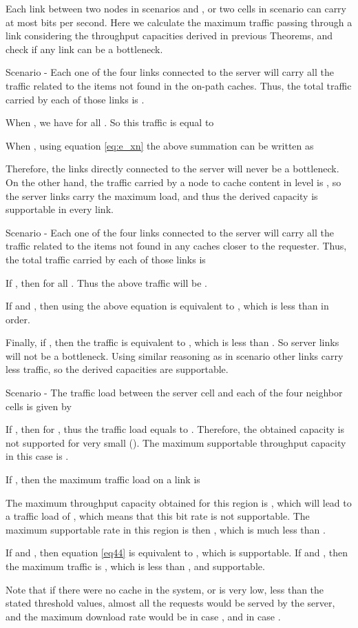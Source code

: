\documentclass[journal]{IEEEtran}
\theoremstyle{plain}
\theoremstyle{remark}
\begin{document}
\begin{IEEEproof}
Each link between two nodes in scenarios  and , or two cells in scenario  can carry at most  bits per second. Here we calculate the maximum traffic passing through a link considering the throughput capacities derived in previous Theorems, and check if any link can be a bottleneck.

Scenario -  Each one of the four links connected to the server will carry all the traffic related to the items not found in the on-path caches. Thus, the total traffic carried by each of those links is
.

When , we have  for all . So this traffic is equal to


When , using equation \ref{eq:e_xn} the above summation can be written as




Therefore, the links directly connected to the server will never be a bottleneck. On the other hand, the traffic carried by a node to cache content in level  is , so the server links carry the maximum load, and thus the derived capacity is supportable in every link. 

Scenario - Each one of the four links connected to the server will carry all the traffic related to the items not found in any caches closer to the requester. Thus, the total traffic carried by each of those links is

 

If , then  for all . Thus the above traffic will be .

If  and , then using  the above equation is equivalent to , which is less than  in order.

Finally, if , then the traffic is equivalent to , which is less than .
 So server links will not be a bottleneck. Using similar reasoning as in scenario  other links carry less traffic, so the derived capacities are supportable.


Scenario - The traffic load between the server cell and each of the four neighbor cells is given by



If , then  for , thus the traffic load equals to . Therefore, the obtained capacity is not supported for very small  (). The maximum supportable throughput capacity in this case is .  

If , then the maximum traffic load on a link is 



The maximum throughput capacity obtained for this region is , which will lead to a traffic load of , which means that this bit rate is not supportable. The maximum supportable rate in this region is then , which is much less than .

If  and , then equation \eqref{eq44}  is equivalent to , which is supportable. If  and , then the maximum traffic is , which is less than , and supportable.

Note that if there were no cache in the system, or  is very low, less than the stated threshold values, almost all the requests would be served by the server, and the maximum download rate would be  in case ,  and  in case .

\end{IEEEproof}
\end{document}
